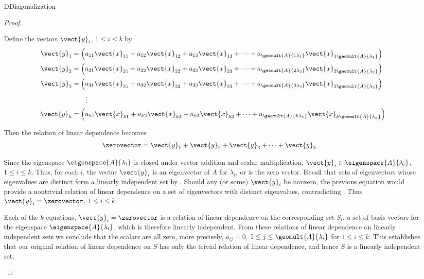 \begin{subsect}{D}{Diagonalization}
\begin{proof}
\begin{para}
\end{para}
%
\begin{para}Define the vectors $\vect{y}_i$, $1\leq i\leq k$ by
%
\begin{align*}
\vect{y}_1&=\left(a_{11}\vect{x}_{11}+a_{12}\vect{x}_{12}+a_{13}\vect{x}_{13}+\cdots+a_{\geomult{A}{1\lambda_1}}\vect{x}_{1\geomult{A}{\lambda_1}}\right)\\
\vect{y}_2&=\left(a_{21}\vect{x}_{21}+a_{22}\vect{x}_{22}+a_{23}\vect{x}_{23}+\cdots+a_{\geomult{A}{2\lambda_2}}\vect{x}_{2\geomult{A}{\lambda_2}}\right)\\
\vect{y}_3&=\left(a_{31}\vect{x}_{31}+a_{32}\vect{x}_{32}+a_{33}\vect{x}_{33}+\cdots+a_{\geomult{A}{3\lambda_3}}\vect{x}_{3\geomult{A}{\lambda_3}}\right)\\
&\quad\quad\vdots\\
\vect{y}_k&=\left(a_{k1}\vect{x}_{k1}+a_{k2}\vect{x}_{k2}+a_{k3}\vect{x}_{k3}+\cdots+a_{\geomult{A}{k\lambda_k}}\vect{x}_{k\geomult{A}{\lambda_k}}\right)
%
\end{align*}\end{para}
%
\begin{para}Then the relation of linear dependence becomes
%
\begin{align*}
\zerovector&=\vect{y}_1+\vect{y}_2+\vect{y}_3+\cdots+\vect{y}_k
\end{align*}
\end{para}
%
\begin{para}Since the eigenspace $\eigenspace{A}{\lambda_i}$ is closed under vector addition and scalar multiplication, $\vect{y}_i\in\eigenspace{A}{\lambda_i}$, $1\leq i\leq k$.  Thus, for each $i$, the vector $\vect{y}_i$ is an eigenvector of $A$ for $\lambda_i$, or is the zero vector.  Recall that sets of eigenvectors whose eigenvalues are distinct form a linearly independent set by .  Should any (or some) $\vect{y}_i$ be nonzero, the previous equation would provide a nontrivial relation of linear dependence on a set of eigenvectors with distinct eigenvalues, contradicting .  Thus $\vect{y}_i=\zerovector$, $1\leq i\leq k$.\end{para}
%
\begin{para}Each of the $k$ equations, $\vect{y}_i=\zerovector$ is a relation of linear dependence on the corresponding set $S_i$, a set of basis vectors for the eigenspace $\eigenspace{A}{\lambda_i}$, which is therefore linearly independent.  From these relations of linear dependence on linearly independent sets we conclude that the scalars are all zero, more precisely, $a_{ij}=0$, $1\leq j\leq\geomult{A}{\lambda_i}$ for $1\leq i\leq k$.  This establishes that our original relation of linear dependence on $S$ has only the trivial relation of linear dependence, and hence $S$ is a linearly independent set.\end{para}

\end{proof}
\end{subsect}

